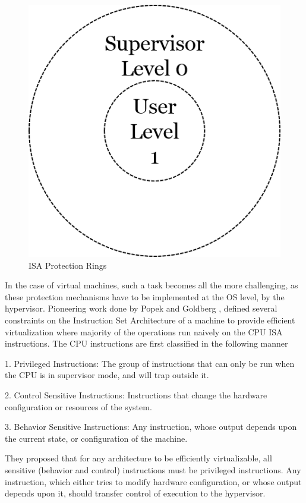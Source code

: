 \begin{figure}[H]
  \centering
  \includegraphics[scale=0.6]{figures/protect_levels.png}
  \caption{ISA Protection Rings}
  \label{fig:protect_2}
\end{figure}
In the case of virtual machines, such a task becomes all the more challenging, as these protection mechanisms have to be implemented at the OS level, by the hypervisor. Pioneering work done by Popek and Goldberg \cite{popek}, defined several constraints on the Instruction Set Architecture of a machine to provide efficient virtualization where majority of the operations run naively on the CPU ISA instructions. The CPU instructions are first classified in the following manner

1. Privileged Instructions: The group of instructions that can only be run when the CPU is in supervisor mode, and will trap outside it.

2. Control Sensitive Instructions: Instructions that change the hardware configuration or resources of the system.

3. Behavior Sensitive Instructions: Any instruction, whose output depends upon the current state, or configuration of the machine.

They proposed that for any architecture to be efficiently virtualizable, all sensitive (behavior and control) instructions must be privileged instructions. Any instruction, which either tries to modify hardware configuration, or whose output depends upon it, should transfer control of execution to the hypervisor.

